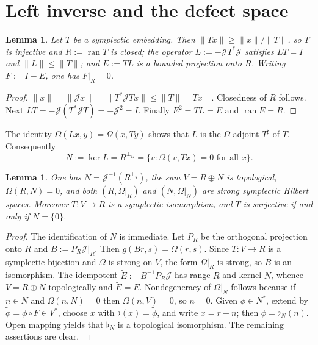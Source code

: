 \documentclass[11pt,a4paper]{article}
\newtheorem{lemma}[theorem]{Lemma}
\theoremstyle{definition}
\newcommand{\cJ}{\mathcal{J}}
\begin{document}
\section{Left inverse and the defect space}

\begin{lemma}
\label{lem:left}
Let \(T\) be a symplectic embedding. Then \(\|Tx\|\ge\|x\|/\|T\|\), so \(T\) is injective and
\(R:=\operatorname{ran}T\) is closed; the operator \(L:=-\cJ T^*\cJ\) satisfies \(LT=I\) and
\(\|L\|\le\|T\|\); and \(E:=TL\) is a bounded projection onto \(R\). Writing \(F:=I-E\), one has
\(F|_R=0\).
\end{lemma}

\begin{proof}
\(\|x\|=\|\cJ x\|=\|T^*\cJ Tx\|\le\|T\|\,\|Tx\|\). Closedness of \(R\) follows. Next
\(LT=-\cJ(T^*\cJ T)=-\cJ^2=I\). Finally \(E^2=TL=E\) and \(\operatorname{ran}E=R\).
\end{proof}

The identity \(\Omega(Lx,y)=\Omega(x,Ty)\) shows that \(L\) is the \(\Omega\)-adjoint \(T^\sharp\) of
\(T\). Consequently
\[
N:=\ker L=R^{\perp_\Omega}=\{v:\Omega(v,Tx)=0\text{ for all }x\}.
\]

\begin{lemma}
\label{lem:N}
One has \(N=\cJ^{-1}(R^{\perp_g})\), the sum \(V=R\oplus N\) is topological, \(\Omega(R,N)=0\), and
both \((R,\Omega|_R)\) and \((N,\Omega|_N)\) are strong symplectic Hilbert spaces. Moreover
\(T:V\to R\) is a symplectic isomorphism, and \(T\) is surjective if and only if \(N=\{0\}\).
\end{lemma}

\begin{proof}
The identification of \(N\) is immediate. Let \(P_R\) be the orthogonal projection onto \(R\) and
\(B:=P_R\cJ|_R\). Then \(g(Br,s)=\Omega(r,s)\). Since \(T:V\to R\) is a symplectic bijection and
\(\Omega\) is strong on \(V\), the form \(\Omega|_R\) is strong, so \(B\) is an isomorphism. The
idempotent \(\widetilde{E}:=B^{-1}P_R\cJ\) has range \(R\) and kernel \(N\), whence
\(V=R\oplus N\) topologically and \(\widetilde{E}=E\). Nondegeneracy of \(\Omega|_N\) follows
because if \(n\in N\) and \(\Omega(n,N)=0\) then \(\Omega(n,V)=0\), so \(n=0\). Given
\(\phi\in N^*\), extend by \(\tilde\phi=\phi\circ F\in V^*\), choose \(x\) with \(\flat(x)=\tilde\phi\),
and write \(x=r+n\); then \(\phi=\flat_N(n)\). Open mapping yields that \(\flat_N\) is a topological
isomorphism. The remaining assertions are clear.
\end{proof}
\end{document}
